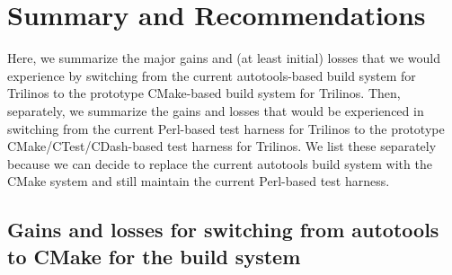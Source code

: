 \documentclass[pdf,ps2pdf,11pt]{SANDreport}
\begin{document}
%
\section{Summary and Recommendations}
%

Here, we summarize the major gains and (at least initial) losses that
we would experience by switching from the current autotools-based
build system for Trilinos to the prototype CMake-based build system for
Trilinos.  Then, separately, we summarize the gains and losses that
would be experienced in switching from the current Perl-based test
harness for Trilinos to the prototype CMake/CTest/CDash-based test
harness for Trilinos.  We list these separately because we can decide
to replace the current autotools build system with the CMake system
and still maintain the current Perl-based test harness.


%
{}\subsection{Gains and losses for switching from autotools to CMake
for the build system}
%
\end{document}
